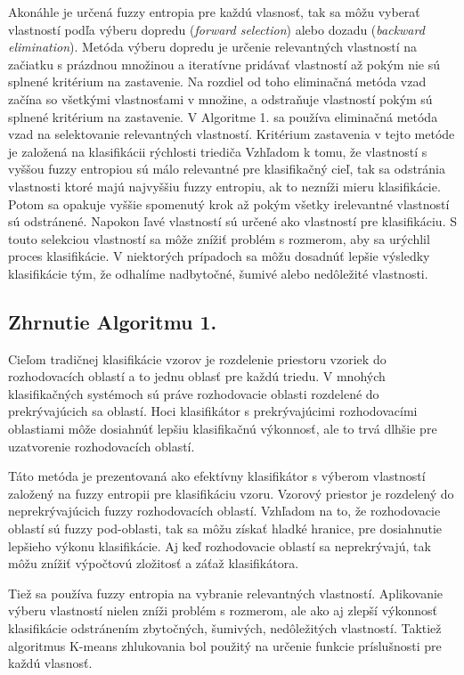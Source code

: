 Akonáhle je určená fuzzy entropia pre každú vlasnosť, tak sa môžu vyberať vlastností podľa výberu dopredu (\textit{forward selection}) alebo dozadu (\textit{backward elimination}). Metóda výberu dopredu je určenie relevantných vlastností na začiatku s prázdnou množinou a iteratívne pridávať vlastností až pokým nie sú splnené kritérium na zastavenie. Na rozdiel od toho eliminačná metóda vzad začína so všetkými vlastnosťami v množine, a odstraňuje vlastností pokým sú splnené kritérium na zastavenie.  
V Algoritme 1. sa používa eliminačná metóda vzad na selektovanie relevantných vlastností.  Kritérium zastavenia v tejto metóde je založená na klasifikácii rýchlosti triediča  Vzhľadom k tomu, že vlastností s vyššou fuzzy entropiou sú málo relevantné pre klasifikačný cieľ, tak sa odstránia vlastnosti ktoré majú najvyššiu fuzzy entropiu, ak to nezníži mieru klasifikácie. Potom sa opakuje vyššie spomenutý krok až pokým všetky irelevantné vlastností sú odstránené. Napokon ľavé vlastností sú určené ako vlastností pre klasifikáciu. S touto selekciou vlastností sa môže znížiť problém s rozmerom, aby sa urýchlil proces klasifikácie. V niektorých prípadoch sa môžu dosadnúť lepšie výsledky klasifikácie tým, že odhalíme nadbytočné, šumivé alebo nedôležité vlastnosti\cite{lee2001}.
\subsection{Zhrnutie Algoritmu 1. }
Cieľom tradičnej klasifikácie vzorov je rozdelenie priestoru vzoriek do rozhodovacích oblastí a to jednu oblasť pre každú triedu. V mnohých klasifikačných systémoch sú práve rozhodovacie oblasti  rozdelené do prekrývajúcich sa oblastí. Hoci klasifikátor s prekrývajúcimi rozhodovacími oblastiami môže dosiahnúť lepšiu klasifikačnú výkonnosť, ale to trvá dlhšie pre uzatvorenie rozhodovacích oblastí\cite{lee2001}.

Táto metóda je prezentovaná ako efektívny klasifikátor s výberom vlastností založený na fuzzy entropii pre klasifikáciu vzoru. Vzorový priestor je rozdelený do neprekrývajúcich fuzzy rozhodovacích oblastí. Vzhľadom na to, že rozhodovacie oblastí sú fuzzy pod-oblasti, tak sa môžu získať hladké hranice, pre dosiahnutie lepšieho výkonu klasifikácie. Aj keď rozhodovacie oblastí sa neprekrývajú, tak môžu znížiť výpočtovú zložitosť a záťaž klasifikátora\cite{lee2001}.

Tiež sa používa fuzzy entropia na vybranie relevantných vlastností. Aplikovanie výberu vlastností nielen zníži problém s rozmerom, ale ako aj zlepší výkonnosť klasifikácie odstránením zbytočných, šumivých, nedôležitých vlastností. Taktiež algoritmus K-means zhlukovania bol použitý na určenie funkcie príslušnosti pre každú vlasnosť\cite{lee2001}.





